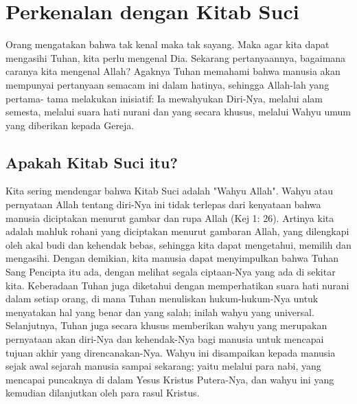 \section{Perkenalan dengan Kitab Suci}
Orang mengatakan bahwa tak kenal maka tak sayang. Maka agar kita dapat mengasihi Tuhan, kita perlu mengenal Dia. Sekarang pertanyaannya, bagaimana caranya kita mengenal Allah?  Agaknya Tuhan memahami bahwa manusia akan mempunyai pertanyaan semacam ini dalam hatinya, sehingga Allah-lah yang pertama- tama melakukan inisiatif: Ia mewahyukan Diri-Nya, melalui alam semesta, melalui suara hati nurani dan yang secara khusus, melalui Wahyu umum yang diberikan kepada Gereja.
\subsection{Apakah Kitab Suci itu?}
Kita sering mendengar bahwa Kitab Suci adalah "Wahyu Allah". Wahyu atau pernyataan Allah tentang diri-Nya ini tidak terlepas dari kenyataan bahwa manusia diciptakan menurut gambar dan rupa Allah (Kej 1: 26). Artinya kita adalah mahluk rohani yang diciptakan menurut gambaran Allah, yang dilengkapi oleh akal budi dan kehendak bebas, sehingga kita dapat mengetahui, memilih dan mengasihi. Dengan demikian, kita manusia dapat menyimpulkan bahwa Tuhan Sang Pencipta itu ada, dengan melihat segala ciptaan-Nya yang ada di sekitar kita. Keberadaan Tuhan juga diketahui dengan memperhatikan suara hati nurani dalam setiap orang, di mana Tuhan menuliskan hukum-hukum-Nya untuk menyatakan hal yang benar dan yang salah; inilah wahyu yang universal. Selanjutnya, Tuhan juga secara khusus memberikan wahyu yang merupakan pernyataan akan diri-Nya dan kehendak-Nya bagi manusia untuk mencapai tujuan akhir yang direncanakan-Nya. Wahyu ini disampaikan kepada manusia sejak awal sejarah manusia sampai sekarang; yaitu  melalui para nabi, yang mencapai puncaknya di dalam Yesus Kristus Putera-Nya, dan wahyu ini yang kemudian dilanjutkan oleh para rasul Kristus.

